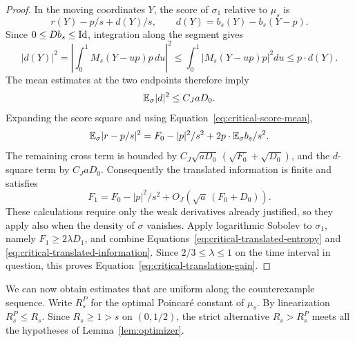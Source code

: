 \begin{proof}
In the moving coordinates $Y$, the score of $\sigma_1$ relative
to $\mu_s$ is
\[
 r(Y)-p/s+d(Y)/s,\qquad d(Y)=b_s(Y)-b_s(Y-p).
\]
Since $0\le Db_s\le\mathrm{Id}$, integration along the segment gives
\[
 |d(Y)|^2
 =\left|\int_0^1M_s(Y-up)p\,du\right|^2
 \le\int_0^1|M_s(Y-up)p|^2du
 \le p\cdot d(Y).
\]
The mean estimates at the two endpoints therefore imply
\begin{equation}\label{eq:critical-posterior-translation-error}
 \mathbb E_\sigma|d|^2\le C_JaD_0.
\end{equation}
Expanding the score square and using
Equation~\eqref{eq:critical-score-mean},
\[
 \mathbb E_\sigma|r-p/s|^2
 =F_0-|p|^2/s^2+2p\cdot\mathbb E_\sigma b_s/s^2.
\]
The remaining cross term is bounded by
$C_J\sqrt{aD_0}\,(\sqrt{F_0}+\sqrt{D_0})$, and the
$d$-square term by $C_JaD_0$. Consequently the translated
information is finite and satisfies
\begin{equation}\label{eq:critical-translated-information}
 F_1=F_0-|p|^2/s^2+O_J(\sqrt a\,(F_0+D_0)).
\end{equation}
These calculations require only the weak derivatives already
justified, so they apply also when the density of $\sigma$ vanishes.
Apply logarithmic Sobolev to $\sigma_1$, namely
$F_1\ge2\lambda D_1$, and combine
Equations~\eqref{eq:critical-translated-entropy} and
\eqref{eq:critical-translated-information}. Since
$2/3\le\lambda\le1$ on the time interval in question, this
proves Equation~\eqref{eq:critical-translation-gain}.
\end{proof}

We can now obtain estimates that are uniform along the counterexample
sequence. Write $R_s^P$ for the optimal Poincar\'e constant of
$\mu_s$. By linearization $R_s^P\le R_s$. Since $R_s\ge1>s$
on $(0,1/2)$, the strict alternative $R_s>R_s^P$ meets all
the hypotheses of Lemma~\ref{lem:optimizer}.

